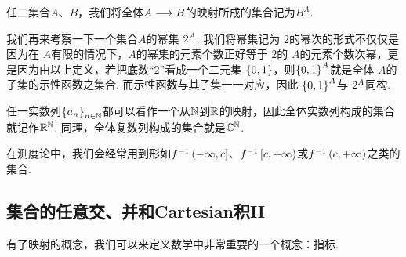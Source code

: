 \vspace{1cm}
\begin{definition}\label{映射集的定义}
    任二集合$A$、$B$，我们将全体$A\longrightarrow B$的映射所成的集合记为$B^A$.
\end{definition}
\begin{example}
    我们再来考察一下一个集合$A$的幂集 $2^{A}$. 我们将幂集记为 $2$的幂次的形式不仅仅是因为在 $A$有限的情况下，$A$的幂集的元素个数正好等于 $2$的 $A$的元素个数次幂，更是因为由以上定义，若把底数“$2$”看成一个二元集 $\left\{ 0,1 \right\}$，则$\left\{ 0,1 \right\}^A$就是全体 $A$的子集的示性函数之集合. 而示性函数与其子集一一对应，因此 $\left\{ 0,1 \right\}^A$与 $2^{A}$同构.
\end{example}
\begin{example}
    任一实数列$\left\{ a_n \right\}_{n\in\mathbb{N}}$都可以看作一个从$\mathbb{N}$到$\mathbb{R}$的映射，因此全体实数列构成的集合就记作$\mathbb{R}^{\mathbb{N}}$. 同理，全体复数列构成的集合就是$\mathbb{C}^{\mathbb{N}}$.
\end{example}

\vspace{1cm}
\begin{remark}
    在测度论中，我们会经常用到形如$f^{-1}\left(-\infty,c\right]$、$f^{-1}\left[c,+\infty\right)$或$f^{-1}\left(c,+\infty\right)$之类的集合.
\end{remark}



\subsection{集合的任意交、并和Cartesian积II}\label{集合任意交并的小节}
有了映射的概念，我们可以来定义数学中非常重要的一个概念：指标.

